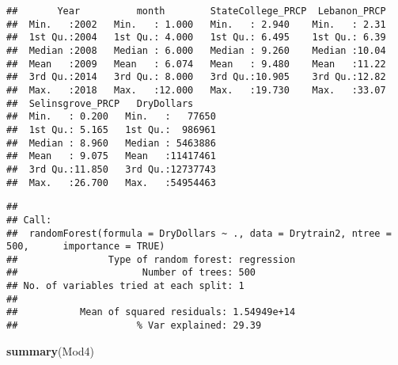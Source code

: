\documentclass[]{article}
\newenvironment{Shaded}{\begin{snugshade}}{\end{snugshade}}
\newcommand{\KeywordTok}[1]{\textcolor[rgb]{0.13,0.29,0.53}{\textbf{{#1}}}}
\newcommand{\DataTypeTok}[1]{\textcolor[rgb]{0.13,0.29,0.53}{{#1}}}
\newcommand{\DecValTok}[1]{\textcolor[rgb]{0.00,0.00,0.81}{{#1}}}
\newcommand{\StringTok}[1]{\textcolor[rgb]{0.31,0.60,0.02}{{#1}}}
\newcommand{\CommentTok}[1]{\textcolor[rgb]{0.56,0.35,0.01}{\textit{{#1}}}}
\newcommand{\OtherTok}[1]{\textcolor[rgb]{0.56,0.35,0.01}{{#1}}}
\newcommand{\NormalTok}[1]{{#1}}
\begin{document}
\begin{verbatim}
##       Year          month        StateCollege_PRCP  Lebanon_PRCP  
##  Min.   :2002   Min.   : 1.000   Min.   : 2.940    Min.   : 2.31  
##  1st Qu.:2004   1st Qu.: 4.000   1st Qu.: 6.495    1st Qu.: 6.39  
##  Median :2008   Median : 6.000   Median : 9.260    Median :10.04  
##  Mean   :2009   Mean   : 6.074   Mean   : 9.480    Mean   :11.22  
##  3rd Qu.:2014   3rd Qu.: 8.000   3rd Qu.:10.905    3rd Qu.:12.82  
##  Max.   :2018   Max.   :12.000   Max.   :19.730    Max.   :33.07  
##  Selinsgrove_PRCP   DryDollars      
##  Min.   : 0.200   Min.   :   77650  
##  1st Qu.: 5.165   1st Qu.:  986961  
##  Median : 8.960   Median : 5463886  
##  Mean   : 9.075   Mean   :11417461  
##  3rd Qu.:11.850   3rd Qu.:12737743  
##  Max.   :26.700   Max.   :54954463
\end{verbatim}

\begin{Shaded}
\end{Shaded}

\begin{verbatim}
## 
## Call:
##  randomForest(formula = DryDollars ~ ., data = Drytrain2, ntree = 500,      importance = TRUE) 
##                Type of random forest: regression
##                      Number of trees: 500
## No. of variables tried at each split: 1
## 
##           Mean of squared residuals: 1.54949e+14
##                     % Var explained: 29.39
\end{verbatim}

\begin{Shaded}
\begin{Highlighting}[]
\KeywordTok{summary}\NormalTok{(Mod4)}
\end{Highlighting}
\end{Shaded}
\end{document}
